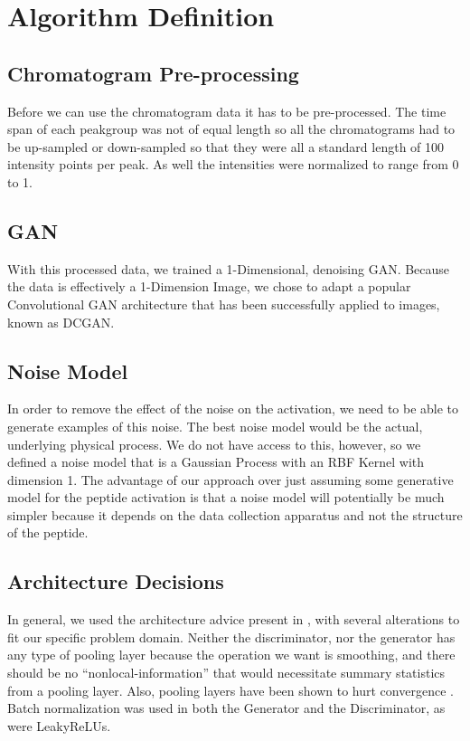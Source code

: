 \documentclass[12pt]{article}
\begin{document}
{\color{black}

\section{Algorithm Definition}
\subsection{Chromatogram Pre-processing}
Before we can use the chromatogram data it has to be pre-processed. The time span of each peakgroup was not of equal length so all the chromatograms had to be up-sampled or down-sampled so that they were all a standard length of 100 intensity points per peak. As well the intensities were normalized to range from 0 to 1.   
\subsection{GAN}
With this processed data, we trained a 1-Dimensional, denoising GAN. Because the
data is effectively a 1-Dimension Image, we chose to adapt a popular
Convolutional GAN architecture that has been successfully applied to images, known as DCGAN.

\subsection{Noise Model}
In order to remove the effect of the noise on the activation, we need to be able to
generate examples of this noise. The best noise model would be the actual,
underlying physical process. We do not have access to this, however, so we
defined a noise model that is a Gaussian Process with an RBF Kernel with
dimension 1. The advantage of our approach over just assuming some generative
model for the peptide activation is that a noise model will potentially be
much simpler because it depends on the data collection apparatus and not the
structure of the peptide.

\subsection{Architecture Decisions}
In general, we used the architecture advice present in \cite{GAN}, with several
alterations to fit our specific problem domain. Neither the discriminator, nor
the generator has any type of pooling layer because the operation we want is
smoothing, and there should be no ``nonlocal-information'' that would
necessitate summary statistics from a pooling layer. Also, pooling layers have
been shown to hurt convergence \cite{GAN}. Batch normalization was used in both
the Generator and the Discriminator, as were LeakyReLUs.

}
\end{document}
